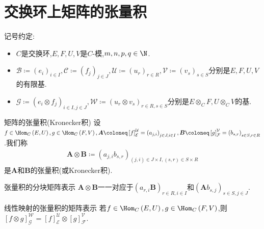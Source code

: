 \section{交换环上矩阵的张量积}

记号约定:

\begin{itemize}
	\item $C$是交换环,$E,F,U,V$是$C$-模,$m,n,p,q\in\N$.
	\item $\mathcal{B}\coloneq\left(e_{i}\right)_{i\in I},\mathcal{C}\coloneq\left(f_{j}\right)_{j\in J},\mathcal{U}\coloneq\left(u_{r}\right)_{r\in R},\mathcal{V}\coloneq\left(v_{s}\right)_{s\in S}$分别是$E,F,U,V$的有限基.
	\item $\mathcal{G}\coloneq\left(e_{i}\otimes f_{j}\right)_{i\in I,j\in J},\mathcal{W}\coloneq\left(u_{r}\otimes v_{s}\right)_{r\in R,s\in S}$分别是$E\otimes_{C}F,U\otimes_{C}V$的基.
\end{itemize}

\begin{definition}{矩阵的张量积(Kronecker积)}{}
	设$f\in\Hom_{C}\left(E,U\right),g\in\Hom_{C}\left(F,V\right),\boldsymbol{A}\coloneq\left[f\right]_{\mathcal{E}}^{\mathcal{U}}=\left(a_{j,i}\right)_{j\in J,i\in I},\boldsymbol{B}\coloneq\left[g\right]_{\mathcal{F}}^{\mathcal{V}}=\left(b_{s,r}\right)_{s\in S,r\in R}$.我们称
	\begin{align*}
		\boldsymbol{A}\otimes\boldsymbol{B}\coloneq\left(a_{j,i}b_{s,r}\right)_{\left(j,i\right)\in J\times I,\left(s,r\right)\in S\times R}
	\end{align*}
	是$\boldsymbol{A}$和$\boldsymbol{B}$的张量积(或Kronecker积).
\end{definition}

\begin{remark}{张量积的分块矩阵表示}{}
	$\boldsymbol{A}\otimes\boldsymbol{B}$一一对应于$\left(a_{r,i}\boldsymbol{B}\right)_{r\in R,i\in I}$和$\left(\boldsymbol{A}b_{s,j}\right)_{s\in S,j\in J}$.
\end{remark}

\begin{proposition}{线性映射的张量积的矩阵表示}{}
	若$f\in\Hom_{C}\left(E,U\right),g\in\Hom_{C}\left(F,V\right)$,则$\left[f\otimes g\right]_{\mathcal{G}}^{\mathcal{W}}=\left[f\right]_{\mathcal{E}}^{\mathcal{U}}\otimes\left[g\right]_{\mathcal{F}}^{\mathcal{V}}$.
\end{proposition}

